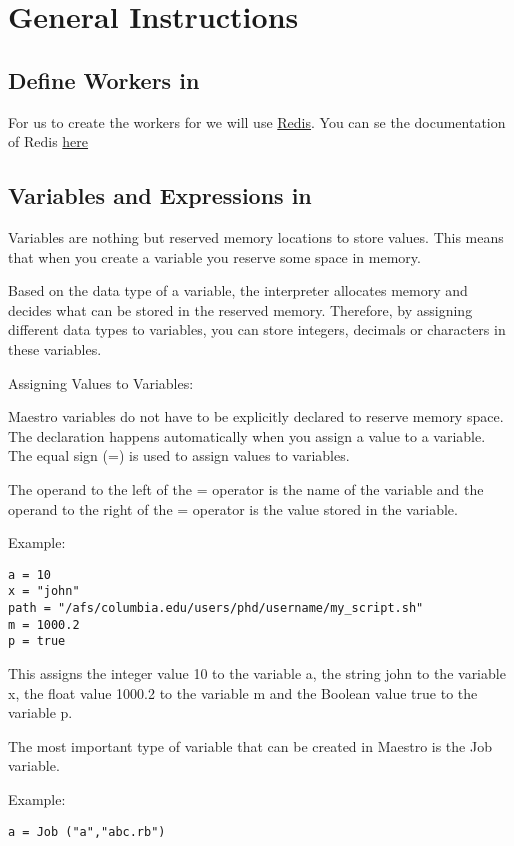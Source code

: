 \section{General Instructions}
\label{sect:general}

\subsection*{Define Workers in \lang{}}
For us to create the workers for \lang{} we will use \href{http://www.redis.io}{Redis}.
You can se the documentation of Redis \href{http://redis.io/documentation}{here}

\subsection*{Variables and Expressions in \lang{}}
Variables are nothing but reserved memory locations to store values. This means that when you create a variable you reserve some space in memory.

Based on the data type of a variable, the interpreter allocates memory and decides what can be stored in the reserved memory. Therefore, by assigning different data types to variables, you can store integers, decimals or characters in these variables.

Assigning Values to Variables:

Maestro variables do not have to be explicitly declared to reserve memory space. The declaration happens automatically when you assign a value to a variable. The equal sign (=) is used to assign values to variables.

The operand to the left of the = operator is the name of the variable and the operand to the right of the = operator is the value stored in the variable. 

Example:
\begin{verbatim}
a = 10
x = "john"
path = "/afs/columbia.edu/users/phd/username/my_script.sh"
m = 1000.2
p = true
\end{verbatim}

This assigns the integer value 10 to the variable a, the string john to the variable x, the float value 1000.2 to the variable m and the Boolean value true to the variable p.

The most important type of variable that can be created in Maestro is the Job variable.

Example:
\begin{verbatim}
a = Job ("a","abc.rb")
\end{verbatim}

